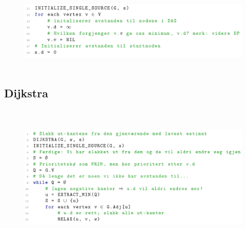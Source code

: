 \documentclass[12pt]{report}
\begin{document}

\par


\vspace{\baselineskip}



\begin{figure}[H]
	\begin{Center}
		\includegraphics[width=6.3in,height=1.53in]{./media/image193.png}
	\end{Center}
\end{figure}






\newpage
\par

\subsection*{Dijkstra}



\begin{figure}[H]
	\begin{Center}
		\includegraphics[width=6.3in,height=2.74in]{./media/image194.png}
	\end{Center}
\end{figure}
\end{document}
